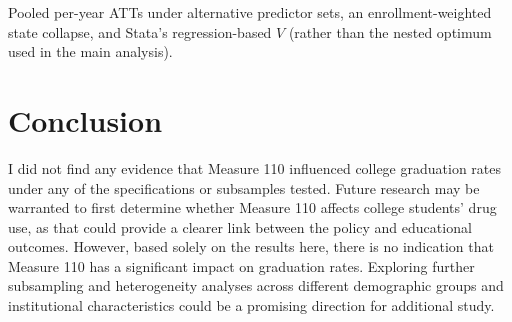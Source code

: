 \documentclass[12pt]{article}
\begin{document}
\begin{table}[htbp]
\centering
\caption{Specification and $V$-Selection Sensitivity (Pooled ATT)}
\label{tab:spec}

\begin{minipage}{0.9\textwidth}
\vspace{4pt}
\footnotesize
Pooled per-year ATTs under alternative predictor sets, an enrollment-weighted
state collapse, and Stata's regression-based $V$ (rather than the nested
optimum used in the main analysis).
\end{minipage}
\end{table}

\section{Conclusion}

I did not find any evidence that Measure 110 influenced college graduation
rates under any of the specifications or subsamples tested. Future research
may be warranted to first determine whether Measure 110 affects college
students' drug use, as that could provide a clearer link between the policy
and educational outcomes. However, based solely on the results here, there
is no indication that Measure 110 has a significant impact on graduation
rates. Exploring further subsampling and heterogeneity analyses across
different demographic groups and institutional characteristics could be a
promising direction for additional study.



\end{document}
